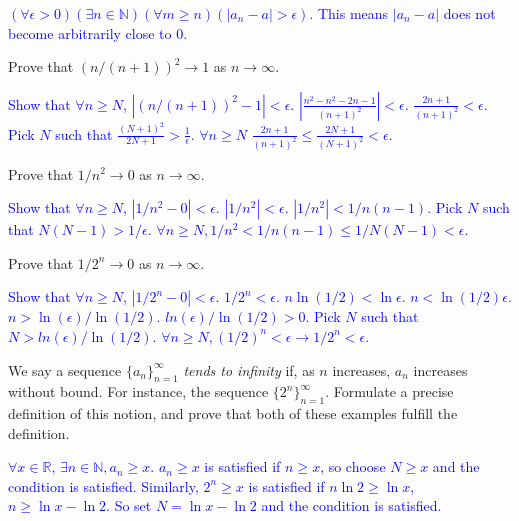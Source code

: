 \documentclass[13.5pt]{article}
\begin{document}
\begin{enumerate}
{\textcolor{blue} {\((\forall \epsilon > 0)(\exists n \in \mathbb{N})(\forall m\geq n)(|a_n-a|>\epsilon)\). This means \(|a_n-a|\) does not become arbitrarily close to 0.}

\item{Prove that \((n/(n+1))^2 \to 1\) as \(n \to \infty\).}

\textcolor{blue} {Show that  \(\forall n \geq N\), \(|(n/(n+1))^2 - 1| < \epsilon\). }
\textcolor{blue} {\(| \frac{n^2-n^2-2n-1}{(n+1)^2}| < \epsilon\). }
\textcolor{blue} {\(\frac{2n+1}{(n+1)^2} < \epsilon\). }
\textcolor{blue} {Pick \(N\) such that \(\frac{(N+1)^2}{2N+1} > \frac{1}{\epsilon}\). }
\textcolor{blue} {\(\forall n \geq N\) \(\frac{2n+1}{(n+1)^2} \leq \frac{2N+1}{(N+1)^2}< \epsilon\).}

\item{Prove that \(1/n^2 \to 0\) as \(n \to \infty\).}

\textcolor{blue} {Show that  \(\forall n \geq N\), \(|1/n^2 - 0| < \epsilon\). }
\textcolor{blue} {\(|1/n^2| < \epsilon\). }
\textcolor{blue} {\(|1/n^2| < 1/n(n-1)\). }
\textcolor{blue} {Pick \(N\) such that \(N(N-1)>1/\epsilon\). }
\textcolor{blue} {\(\forall n \geq N, 1/n^2 < 1/n(n-1) \leq 1/N(N-1) < \epsilon\).}

\item{Prove that \(1/2^n \to 0\) as \(n \to \infty\).}

\textcolor{blue} {Show that  \(\forall n \geq N\), \(|1/2^n - 0| < \epsilon\). }
\textcolor{blue} {\(1/2^n < \epsilon\). }
\textcolor{blue} {\(n\ln(1/2) < \ln\epsilon\). }
\textcolor{blue} {\(n < \ln(1/2)\epsilon\). }
\textcolor{blue} {\(n > \ln(\epsilon)/\ln(1/2)\). }
\textcolor{blue} {\(ln(\epsilon)/\ln(1/2)>0\).}
\textcolor{blue} {Pick \(N\) such that \(N>ln(\epsilon)/\ln(1/2)\). }
\textcolor{blue} {\(\forall n \geq N, (1/2)^n < \epsilon \rightarrow 1/2^n < \epsilon\).}


\item{We say a sequence $\{a_n\}_{n=1}^\infty$ \textit{tends to infinity} if, as \(n\) increases, \(a_n\) increases without bound. For instance, the sequence $\{2^n\}_{n=1}^\infty$. Formulate a precise definition of
this notion, and prove that both of these examples fulfill the definition.}

\textcolor{blue} { \(\forall x \in \mathbb{R}\), \(\exists n \in \mathbb{N}, a_n \geq x.\)}
\textcolor{blue} {\(a_n \ge x\) is satisfied if \(n \ge x\), so choose \(N \geq x\) and the condition is satisfied. Similarly, \(2^n \ge x\) is satisfied if \(n\ln2 \geq \ln x\), \(n \geq \ln x - \ln2 \). So set  \(N=\ln x - \ln2\) and the condition is satisfied. }



}
\end{enumerate}
\end{document}
